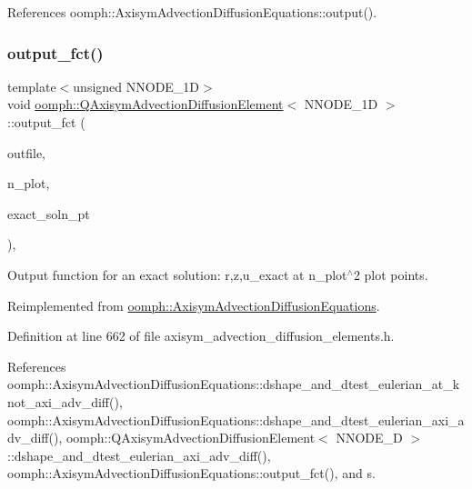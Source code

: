 References oomph\+::\+Axisym\+Advection\+Diffusion\+Equations\+::output().

\mbox{\label{classoomph_1_1QAxisymAdvectionDiffusionElement_a07a6680226c412753604695d77b19467}} 
\subsubsection{\texorpdfstring{output\+\_\+fct()}{output\_fct()}}
{\footnotesize\ttfamily template$<$unsigned N\+N\+O\+D\+E\+\_\+1D$>$ \\
void \hyperlink{classoomph_1_1QAxisymAdvectionDiffusionElement}{oomph\+::\+Q\+Axisym\+Advection\+Diffusion\+Element}$<$ N\+N\+O\+D\+E\+\_\+1D $>$\+::output\+\_\+fct (\begin{DoxyParamCaption}\item[{std\+::ostream \&}]{outfile,  }\item[{const unsigned \&}]{n\+\_\+plot,  }\item[{\hyperlink{classoomph_1_1FiniteElement_a690fd33af26cc3e84f39bba6d5a85202}{Finite\+Element\+::\+Steady\+Exact\+Solution\+Fct\+Pt}}]{exact\+\_\+soln\+\_\+pt }\end{DoxyParamCaption})\hspace{0.3cm}{\ttfamily [inline]}, {\ttfamily [virtual]}}



Output function for an exact solution\+: r,z,u\+\_\+exact at n\+\_\+plot$^\wedge$2 plot points. 



Reimplemented from \hyperlink{classoomph_1_1AxisymAdvectionDiffusionEquations_a7e09458177108a164dbc0dbf45179d0e}{oomph\+::\+Axisym\+Advection\+Diffusion\+Equations}.



Definition at line 662 of file axisym\+\_\+advection\+\_\+diffusion\+\_\+elements.\+h.



References oomph\+::\+Axisym\+Advection\+Diffusion\+Equations\+::dshape\+\_\+and\+\_\+dtest\+\_\+eulerian\+\_\+at\+\_\+knot\+\_\+axi\+\_\+adv\+\_\+diff(), oomph\+::\+Axisym\+Advection\+Diffusion\+Equations\+::dshape\+\_\+and\+\_\+dtest\+\_\+eulerian\+\_\+axi\+\_\+adv\+\_\+diff(), oomph\+::\+Q\+Axisym\+Advection\+Diffusion\+Element$<$ N\+N\+O\+D\+E\+\_\+D $>$\+::dshape\+\_\+and\+\_\+dtest\+\_\+eulerian\+\_\+axi\+\_\+adv\+\_\+diff(), oomph\+::\+Axisym\+Advection\+Diffusion\+Equations\+::output\+\_\+fct(), and s.

